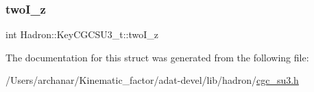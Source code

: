 \subsubsection{\texorpdfstring{twoI\_z}{twoI\_z}}
{\footnotesize\ttfamily int Hadron\+::\+Key\+C\+G\+C\+S\+U3\+\_\+t\+::two\+I\+\_\+z}



The documentation for this struct was generated from the following file\+:\begin{DoxyCompactItemize}
\item 
/\+Users/archanar/\+Kinematic\+\_\+factor/adat-\/devel/lib/hadron/\mbox{\hyperlink{adat-devel_2lib_2hadron_2cgc__su3_8h}{cgc\+\_\+su3.\+h}}\end{DoxyCompactItemize}
